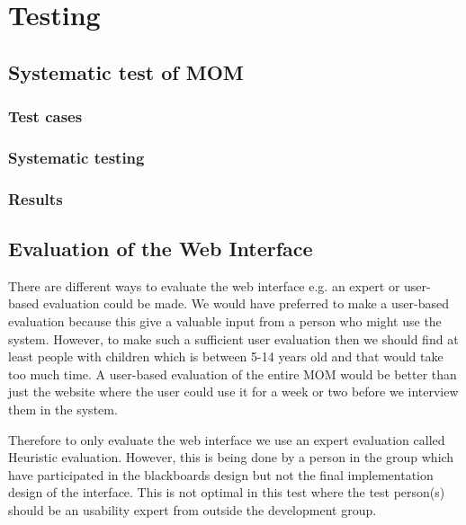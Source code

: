 \chapter{Testing}

\section{Systematic test of MOM}
\subsection{Test cases} %
\subsection{Systematic testing}
\subsection{Results}

\section{Evaluation of the Web Interface}%
There are different ways to evaluate the web interface e.g. an expert or user-based evaluation could be made. We would have preferred to make a user-based evaluation because this give a valuable input from a person who might use the system. However, to make such a sufficient user evaluation then we should find at least people with children which is between 5-14 years old and that would take too much time. A user-based evaluation of the entire MOM would be better than just the website where the user could use it for a week or two before we interview them in the system.

Therefore to only evaluate the web interface we use an expert evaluation called Heuristic evaluation. However, this is being done by a person in the group which have participated in the blackboards design but not the final implementation design of the interface. This is not optimal in this test where the test person(s) should be an usability expert from outside the development group. 

